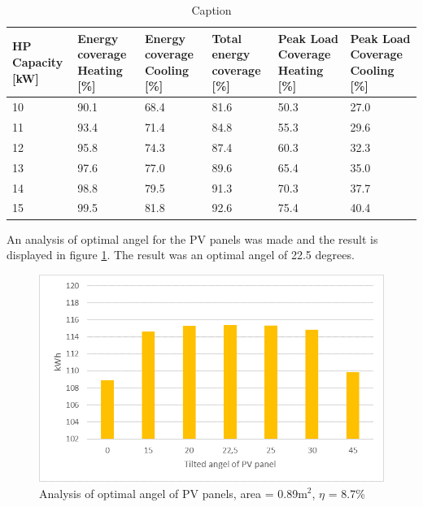 \begin{table}[h!]
    \centering
       \caption{Caption}
    \begin{tabular}{|p{2cm}|p{2cm}|p{2cm}|p{2cm}|p{2cm}|p{2cm}|}
    \hline
        HP Capacity [kW] & Energy coverage Heating [\%]  & Energy coverage Cooling [\%] & Total energy coverage [\%] & Peak Load Coverage Heating [\%] & Peak Load Coverage Cooling [\%] \\
         \hline
          10 & 90.1 & 68.4 & 81.6 & 50.3& 27.0  \\
         \hline
         11 & 93.4 & 71.4 & 84.8 & 55.3 & 29.6   \\
         \hline
          12 & 95.8 & 74.3  & 87.4 &  60.3 & 32.3  \\
         \hline
          13 & 97.6 & 77.0 & 89.6 & 65.4 & 35.0 \\
         \hline
         14 & 98.8 & 79.5 & 91.3 & 70.3 & 37.7 \\
         \hline
         15 & 99.5 & 81.8 & 92.6 & 75.4 & 40.4  \\
         \hline
    \end{tabular}
    \label{tab:my_label}
\end{table}

An analysis of optimal angel for the PV panels was made and the result is displayed in figure \ref{fig:angel}. The result was an optimal angel of 22.5 degrees. 

\begin{figure}[h!]
    \centering
    \includegraphics[scale=0.8]{vedlegg/angel.png}
    \caption{Analysis of optimal angel of PV panels, area = 0.89m$^2$, $\eta$ = 8.7\%}
    \label{fig:angel}
\end{figure}

\pagebreak

